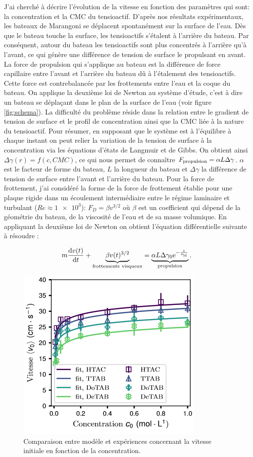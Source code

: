 \documentclass[french, 10pt]{article}
\begin{document}
J'ai cherché à décrire l'évolution de la vitesse en fonction des paramètres qui sont: la concentration et la CMC du tensioactif. D'après nos résultats expérimentaux, les bateaux de Marangoni se déplacent spontanément sur la surface de l'eau. Dès que le bateau touche la surface, les tensioactifs s'étalent à l'arrière du bateau. Par conséquent, autour du bateau les tensioactifs sont plus concentrés à l'arrière qu'à l'avant, ce qui génère une différence de tension de surface le propulsant en avant. La force de propulsion qui s'applique au bateau est la différence de force capillaire entre l'avant et l'arrière du bateau dû à l'étalement des tensioactifs. Cette force est contrebalancée par les frottements entre l'eau et la coque du bateau. On applique la deuxième loi de Newton au système d'étude, c'est à dire un bateau se déplaçant dans le plan de la surface de l'eau (voir figure \ref{fig:schema}). La difficulté du problème réside dans la relation entre le gradient de tension de surface et le profil de concentration ainsi que la CMC liée à la nature du tensioactif. Pour résumer, en supposant que le système est à l'équilibre à chaque instant on peut relier la variation de la tension de surface à la concentration via les équations d'états de Langmuir et de Gibbs. On obtient ainsi $\Delta\gamma(r) = f(c, CMC)$, ce qui nous permet de connaître $F_{\rm propulsion} = \alpha L\Delta\gamma$. $\alpha$ est le facteur de forme du bateau, $L$ la longueur du bateau et $\Delta\gamma$ la différence de tension de surface entre l'avant et l'arrière du bateau. Pour la force de frottement, j'ai considéré la forme de la force de frottement établie pour une plaque rigide dans un écoulement intermédiaire entre le régime laminaire et turbulant ($Re\approx \num{1e3}$): $F_{D} = \beta v^{3/2}$ où $\beta$ est un coefficient qui dépend de la géométrie du bateau, de la viscosité de l'eau et de sa masse volumique. En appliquant la deuxième loi de Newton on obtient l'équation différentielle suivante à résoudre : 

\begin{equation}
  m\frac{\mathrm{d}v(t)}{\mathrm{d}t} + \underbrace{\beta v(t)^{3/2}}_{\rm frottements~visqueux} = \underbrace{\alpha L\Delta\gamma_0{\rm e}^{-\frac{t}{\tau_{\rm M}}}}_{\rm propulsion}.
  \label{eqn:differentielle}
\end{equation}

\begin{figure}
  \centering
  \includegraphics[width=.4\textwidth]{V0C.png}
  \caption{Comparaison entre modèle et expériences concernant la vitesse initiale en fonction de la concentration.}
  \label{fig:vitessevo}  
\end{figure}
\end{document}
